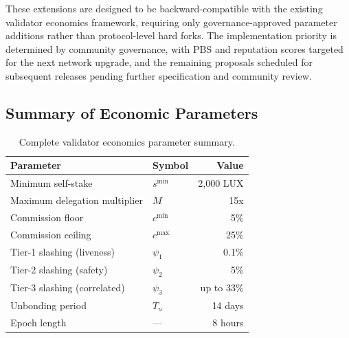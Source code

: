 \documentclass[11pt,a4paper]{article}
\begin{document}
These extensions are designed to be backward-compatible with the existing
validator economics framework, requiring only governance-approved parameter
additions rather than protocol-level hard forks.
The implementation priority is determined by community governance,
with PBS and reputation scores targeted for the next network upgrade,
and the remaining proposals scheduled for subsequent releases pending
further specification and community review.

\subsection{Summary of Economic Parameters}

\begin{table}[H]
\centering
\caption{Complete validator economics parameter summary.}
\label{tab:paramsum}
\begin{tabular}{llr}
\toprule
\textbf{Parameter} & \textbf{Symbol} & \textbf{Value} \\
\midrule
Minimum self-stake & $s^{\min}$ & 2,000 LUX \\
Maximum delegation multiplier & $M$ & 15x \\
Commission floor & $c^{\min}$ & 5\% \\
Commission ceiling & $c^{\max}$ & 25\% \\
Tier-1 slashing (liveness) & $\psi_1$ & 0.1\% \\
Tier-2 slashing (safety) & $\psi_2$ & 5\% \\
Tier-3 slashing (correlated) & $\psi_3$ & up to 33\% \\
Unbonding period & $T_u$ & 14 days \\
Epoch length & --- & 8 hours \\
\bottomrule
\end{tabular}
\end{table}
\end{document}
